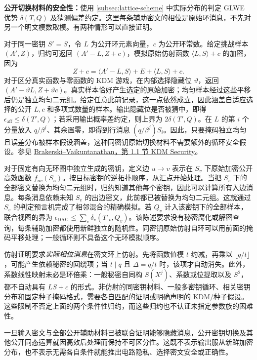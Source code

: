 \noindent\textbf{公开切换材料的安全性：}使用 \autoref{subsec:lattice-scheme} 中实际分布的判定 GLWE 优势 $\delta(T,Q)$ 及猜测偏差约定。这里每条辅助密文的相位是原始环消息，不先对另一个明文模数取模。有两种情形可以直接证明。

对于同一密钥 $S'=S$，令 $L$ 为公开环元素向量，$c$ 为公开环常数。给定挑战样本 $(A',Z)$，归约可返回 $(A'-L,Z+c)$，模拟原始仿射函数 $\langle L,S\rangle+c$ 的加密，因为
\[
Z+c=\langle A'-L,S\rangle+E+\langle L,S\rangle+c.
\]
对于区分真实函数与零函数的 KDM 游戏，在内部选择隐藏位 $\vartheta$，返回 $(A'-\vartheta L,Z+\vartheta c)$。真实样本恰好产生选定的原始加密；均匀样本经过这些平移后仍是独立均匀二元组。给定任意此前记录，这一点依然成立，因此涵盖自适应选择的公开 $L,c$ 和多项式数量的样本。输出隐藏位是否被猜中，即得 $\epsilon_{\mathrm{aff}}\le\delta(T',Q)$；若采用输出概率差约定，则上界为 $2\delta(T',Q)$。在 $L$ 的第 $i$ 个分量放入 $q/\beta^j$、其余置零，即得到行消息 $(q/\beta^j)S_i$。因此，只要掩码独立均匀且误差分布被样本假设涵盖，这种同密钥原始切换材料不需要额外的循环安全假设。参见 \href{https://www.cs.toronto.edu/~vinodv/BV-Crypto2011.pdf}{Brakerski--Vaikuntanathan，第 1.1 节 KDM Security}。

对于固定有向无环图中独立生成的密钥，定义边 $u\to v$ 表示在 $S_v$ 下原始加密公开高效函数 $f_{uv}(S_u)$。按目标密钥的逆拓扑顺序，从汇点开始处理。当把 $S_v$ 下的全部密文替换为均匀二元组时，归约知道其他每个密钥，因此可以计算所有入边消息。每条消息依赖未知 $S_v$ 的出边密文，此前都已被替换为均匀二元组。这就通过 $S_v$ 的判定预言机完成了相邻混合的精确模拟。若 $Q_v$ 计入该密钥下的全部样本，联合视图的界为 $\epsilon_{\mathrm{DAG}}\le\sum_v\delta_v(T'_v,Q_v)$。该陈述要求没有秘密腐化或解密查询，每条辅助加密都使用新鲜独立的随机性。同密钥原始仿射自环可以用前面的掩码平移处理；一般循环则不具备这个无环模拟顺序。

仿射证明要求\emph{实际相位消息}在密文环上仿射。先将函数值模 $t$ 约减，再乘以 $\lfloor q/t\rfloor$，可能产生依赖秘密的回绕项；当 $t\mid q$ 且 $\Delta=q/t$ 时，该项才自动消失。此外，系数线性映射未必是环倍乘：一般秘密自同构 $S(X^j)$、系数或位提取以及 $S^2$，都不自动具有 $LS+c$ 的形式。非仿射的同密钥材料、一般多密钥循环、相关密钥分布和固定种子掩码格式，需要各自匹配的证明或明确声明的 KDM/种子假设。这些限制不否定上面的两个条件性归约，而这些归约也不认证未指定参数族的困难性。

一旦输入密文与全部公开辅助材料已被联合证明能够隐藏消息，公开密钥切换及其他公开同态运算就因高效后处理而保持不可区分性。这既不表示输出服从新鲜加密分布，也不表示无需各自条件就能推出电路隐私、选择密文安全或正确性。
